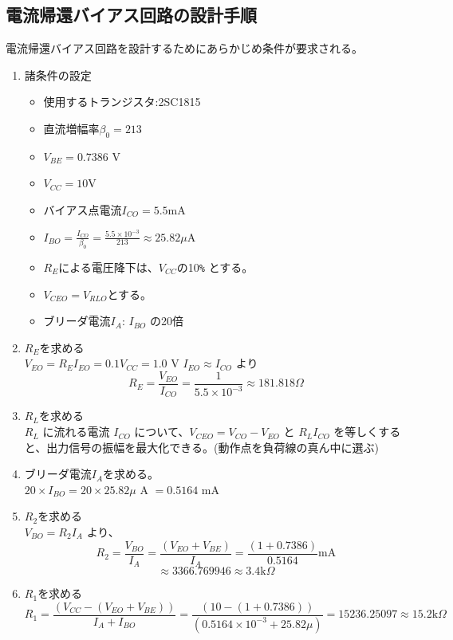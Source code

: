 \subsection{電流帰還バイアス回路の設計手順}
電流帰還バイアス回路を設計するためにあらかじめ条件が要求される。
\begin{enumerate}
  \setlength{\parskip}{0cm} %
  \setlength{\itemsep}{0cm} %
  \item 諸条件の設定
  \begin{itemize}
    \item 使用するトランジスタ:2SC1815
    \item 直流増幅率$\beta_0 = 213$
    \item $V_{BE} = 0.7386$ V
    \item $V_{CC} = 10$V
    \item バイアス点電流$I_{CO}=5.5$mA
    \item $I_{BO}= \frac{I_{CO}}{\beta_0} = \frac{5.5\times10^{-3}}{213} \approx 25.82 \mu$A
    \item $R_E$による電圧降下は、$V_{CC}$の10\verb|%| とする。
    \item $V_{CEO} = V_{RLO}$とする。
    \item ブリーダ電流$I_A$: $I_{BO}$ の20倍
  \end{itemize}
  \item $R_E$を求める\\
  $V_{EO} = R_EI_{EO} = 0.1V_{CC} = 1.0$ V $I_{EO} \approx I_{CO}$ より
$$R_E = \frac{V_{EO}}{I_{CO}} = \frac{1}{5.5 \times 10^{-3}} \approx 181.818 \Omega$$
  \item $R_L$を求める\\
  $R_L$ に流れる電流 $I_{CO}$ について、$V_{CEO} = V_{CO} -V_{EO}$ と $R_LI_{CO}$ を等しくすると、出力信号の振幅を最大化できる。(動作点を負荷線の真ん中に選ぶ)
  \item ブリーダ電流$I_A$を求める。\\
  $20 \times I_{BO} = 20 \times 25.82 \mu$ A $= 0.5164$ mA
  \item $R_2$を求める\\
  $V_{BO} = R_2I_A$ より、$$R_2 = \frac{V_{BO}}{I_A} = \frac{(V_{EO}+V_{BE})}{I_A} = \frac{(1+0.7386)}{0.5164}\textrm{mA}$$ $$\approx 3366.769946 \approx 3.4 \textrm{k}\Omega$$
  \item $R_1$を求める
  $$R_1 = \frac{(V_{CC} - (V_{EO}+V_{BE}))}{I_A+I_{BO}} = \frac{(10 - (1+0.7386))}{(0.5164 \times 10^{-3} + 25.82\mu)} = 15236.25097 \approx 15.2 \textrm{k}\Omega$$
\end{enumerate}

